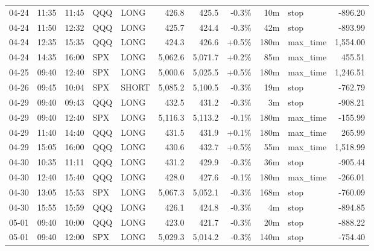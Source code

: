 \documentclass[11pt,a4paper,twoside]{article}
\begin{document}
\begin{center}
\begin{longtable}{>{\color{txtmain}}l l l l l r r r r >{\color{txtmain}}l r}
04-24 & 11:35 & 11:45 & QQQ & LONG & 426.8 & 425.5 & \textcolor{lossred}{-0.3\%} & 10m & stop & \textcolor{lossred}{-896.20} \\
04-24 & 11:50 & 12:32 & QQQ & LONG & 425.7 & 424.4 & \textcolor{lossred}{-0.3\%} & 42m & stop & \textcolor{lossred}{-893.99} \\
04-24 & 12:35 & 15:35 & QQQ & LONG & 424.3 & 426.6 & \textcolor{wingreen}{+0.5\%} & 180m & max\_time & \textcolor{wingreen}{1,554.00} \\
04-24 & 14:35 & 16:00 & SPX & LONG & 5,062.6 & 5,071.7 & \textcolor{wingreen}{+0.2\%} & 85m & max\_time & \textcolor{wingreen}{455.51} \\
04-25 & 09:40 & 12:40 & SPX & LONG & 5,000.6 & 5,025.5 & \textcolor{wingreen}{+0.5\%} & 180m & max\_time & \textcolor{wingreen}{1,246.51} \\
04-26 & 09:45 & 10:04 & SPX & SHORT & 5,085.2 & 5,100.5 & \textcolor{lossred}{-0.3\%} & 19m & stop & \textcolor{lossred}{-762.79} \\
04-29 & 09:40 & 09:43 & QQQ & LONG & 432.5 & 431.2 & \textcolor{lossred}{-0.3\%} & 3m & stop & \textcolor{lossred}{-908.21} \\
04-29 & 09:40 & 12:40 & SPX & LONG & 5,116.3 & 5,113.2 & \textcolor{lossred}{-0.1\%} & 180m & max\_time & \textcolor{lossred}{-155.99} \\
04-29 & 11:40 & 14:40 & QQQ & LONG & 431.5 & 431.9 & \textcolor{wingreen}{+0.1\%} & 180m & max\_time & \textcolor{wingreen}{265.99} \\
04-29 & 15:05 & 16:00 & QQQ & LONG & 430.6 & 432.7 & \textcolor{wingreen}{+0.5\%} & 55m & max\_time & \textcolor{wingreen}{1,518.99} \\
04-30 & 10:35 & 11:11 & QQQ & LONG & 431.2 & 429.9 & \textcolor{lossred}{-0.3\%} & 36m & stop & \textcolor{lossred}{-905.44} \\
04-30 & 12:40 & 15:40 & QQQ & LONG & 428.0 & 427.6 & \textcolor{lossred}{-0.1\%} & 180m & max\_time & \textcolor{lossred}{-266.01} \\
04-30 & 13:05 & 15:53 & SPX & LONG & 5,067.3 & 5,052.1 & \textcolor{lossred}{-0.3\%} & 168m & stop & \textcolor{lossred}{-760.09} \\
04-30 & 15:55 & 15:59 & QQQ & LONG & 426.1 & 424.8 & \textcolor{lossred}{-0.3\%} & 4m & stop & \textcolor{lossred}{-894.85} \\
05-01 & 09:40 & 10:00 & QQQ & LONG & 423.0 & 421.7 & \textcolor{lossred}{-0.3\%} & 20m & stop & \textcolor{lossred}{-888.22} \\
05-01 & 09:40 & 12:00 & SPX & LONG & 5,029.3 & 5,014.2 & \textcolor{lossred}{-0.3\%} & 140m & stop & \textcolor{lossred}{-754.40} \\

\end{longtable}
\end{center}
\end{document}
